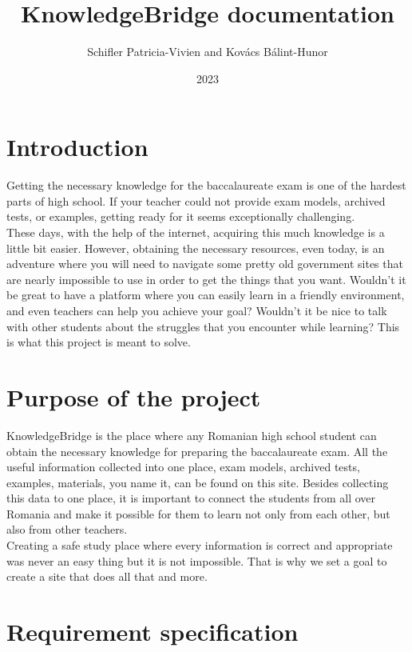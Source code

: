 \documentclass[12pt,a4paper]{article}
\title{KnowledgeBridge documentation}
\author{Schifler Patricia-Vivien and Kovács Bálint-Hunor}
\date{2023}
\begin{document}


\newpage
\tableofcontents
\newpage
\begin{spacing}{1.5}
    \section{Introduction}\label{sec:intro}
    Getting the necessary knowledge for the baccalaureate exam is one of the
    hardest parts of high school. If your teacher could not provide exam models,
    archived tests, or examples, getting ready for it seems exceptionally
    challenging. \\ \indent These days, with the help of the internet, acquiring
    this much knowledge is a little bit easier. However, obtaining the necessary
    resources, even today, is an adventure where you will need to navigate some
    pretty old government sites that are nearly impossible to use in order to get
    the things that you want. Wouldn't it be great to have a platform where you can
    easily learn in a friendly environment, and even teachers can help you achieve
    your goal? Wouldn't it be nice to talk with other students about the struggles
    that you encounter while learning? This is what this project is meant to solve.

    \section{Purpose of the project}\label{sec:purpose}

    KnowledgeBridge is the place where any Romanian high school student can obtain
    the necessary knowledge for preparing the baccalaureate exam. All the useful
    information collected into one place, exam models, archived tests, examples,
    materials, you name it, can be found on this site. Besides collecting this data
    to one place, it is important to connect the students from all over Romania and
    make it possible for them to learn not only from each other, but also from
    other teachers. \\ \indent Creating a safe study place where every information
    is correct and appropriate was never an easy thing but it is not impossible.
    That is why we set a goal to create a site that does all that and more.

    \section{Requirement specification}\label{sec:req_spec}

\end{spacing}
\end{document}
